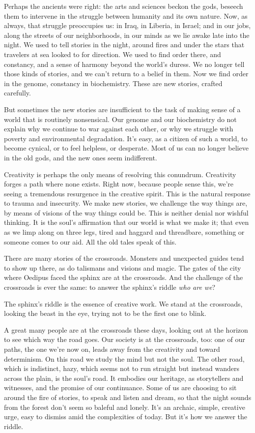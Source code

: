 \documentclass[letterpaper,oneside]{memoir}
\begin{document}
Perhaps the ancients were right: the arts and sciences beckon the gods, beseech them to intervene in the struggle between humanity and its own nature. Now, as always, that struggle preoccupies us: in Iraq, in Liberia, in Israel; and in our jobs, along the streets of our neighborhoods, in our minds as we lie awake late into the night. We used to tell stories in the night, around fires and under the stars that travelers at sea looked to for direction. We used to find order there, and constancy, and a sense of harmony beyond the world's duress. We no longer tell those kinds of stories, and we can't return to a belief in them. Now we find order in the genome, constancy in biochemistry. These are new stories, crafted carefully.

But sometimes the new stories are insufficient to the task of making sense of a world that is routinely nonsensical. Our genome and our biochemistry do not explain why we continue to war against each other, or why we struggle with poverty and environmental degradation. It's easy, as a citizen of such a world, to become cynical, or to feel helpless, or desperate. Most of us can no longer believe in the old gods, and the new ones seem indifferent.

Creativity is perhaps the only means of resolving this conundrum. Creativity forges a path where none exists. Right now, because people sense this, we're seeing a tremendous resurgence in the creative spirit. This is the natural response to trauma and insecurity. We make new stories, we challenge the way things are, by means of visions of the way things could be. This is neither denial nor wishful thinking. It is the soul's affirmation that our world is what we make it; that even as we limp along on three legs, tired and haggard and threadbare, something or someone comes to our aid. All the old tales speak of this.

There are many stories of the crossroads. Monsters and unexpected guides tend to show up there, as do talismans and visions and magic. The gates of the city where Oedipus faced the sphinx are at the crossroads. And the challenge of the crossroads is ever the same: to answer the sphinx's riddle \textit{who are we}?

The sphinx's riddle is the essence of creative work. We stand at the crossroads, looking the beast in the eye, trying not to be the first one to blink.

A great many people are at the crossroads these days, looking out at the horizon to see which way the road goes. Our society is at the crossroads, too: one of our paths, the one we're now on, leads away from the creativity and toward determinism. On this road we study the mind but not the soul. The other road, which is indistinct, hazy, which seems not to run straight but instead wanders across the plain, is the soul's road. It embodies our heritage, as storytellers and witnesses, and the promise of our continuance. Some of us are choosing to sit around the fire of stories, to speak and listen and dream, so that the night sounds from the forest don't seem so baleful and lonely. It's an archaic, simple, creative urge, easy to dismiss amid the complexities of today. But it's how we answer the riddle.
\end{document}
